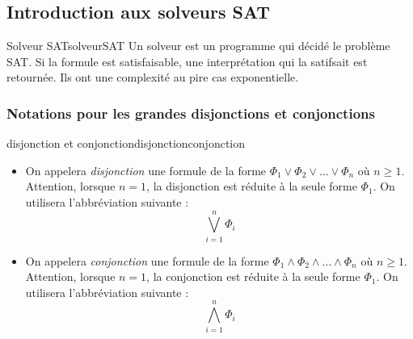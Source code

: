 \subsection{Introduction aux solveurs SAT}
\begin{definition}{Solveur SAT}{solveurSAT}
    Un solveur est un programme qui décidé le problème SAT. Si la formule est satisfaisable, une interprétation qui la satifsait est retournée. Ils ont une complexité au pire cas exponentielle. 
\end{definition}

\subsubsection{Notations pour les grandes disjonctions et conjonctions}
\begin{definition}{disjonction et conjonction}{disjonctionconjonction}
    \begin{itemize}[label=\textbullet]
        \item On appelera \textit{disjonction} une formule de la forme $\Phi_1\vee\Phi_2\vee\dots\vee\Phi_n$ où $n \geq 1$. Attention, lorsque $n=1$, la disjonction est réduite à la seule forme $\Phi_1$. On utilisera l'abbréviation suivante :
        \begin{equation*}
            \bigvee_{i=1}^{n}\Phi_i
        \end{equation*}
        \item On appelera \textit{conjonction} une formule de la forme $\Phi_1\wedge\Phi_2\wedge\dots\wedge\Phi_n$ où $n \geq 1$. Attention, lorsque $n=1$, la conjonction est réduite à la seule forme $\Phi_1$. On utilisera l'abbréviation suivante :
        \begin{equation*}
            \bigwedge_{i=1}^{n}\Phi_i
        \end{equation*}
    \end{itemize}
    
\end{definition}

